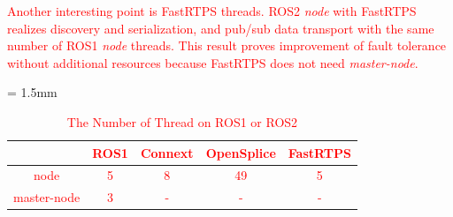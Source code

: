 \documentclass{sig-alternate-05-2015}
\begin{document}
\textcolor{red}{
Another interesting point is FastRTPS threads.
ROS2 \emph{node} with FastRTPS realizes discovery and serialization, and pub/sub data transport with the same number of ROS1 \emph{node} threads.
This result proves improvement of fault tolerance without additional resources because FastRTPS does not need \emph{master-node}.
}
\begin{table}[t]
  \caption{\label{tb:thread}\textcolor{red}{The Number of Thread on ROS1 or ROS2}}
  \centering
  \tabcolsep = 1.5mm              %
  \textcolor{red}{
  \begin{tabular}{c|cccc}
    \hline
    & ROS1 & Connext & OpenSplice & FastRTPS \\
    \hline
    \hline
    node & 5 & 8 & 49 & 5 \\
    master-node & 3 & - & - & - \\
    \hline
  \end{tabular}
  }
  \vspace{-5mm}
\end{table}

\vspace{-1mm}
\end{document}
